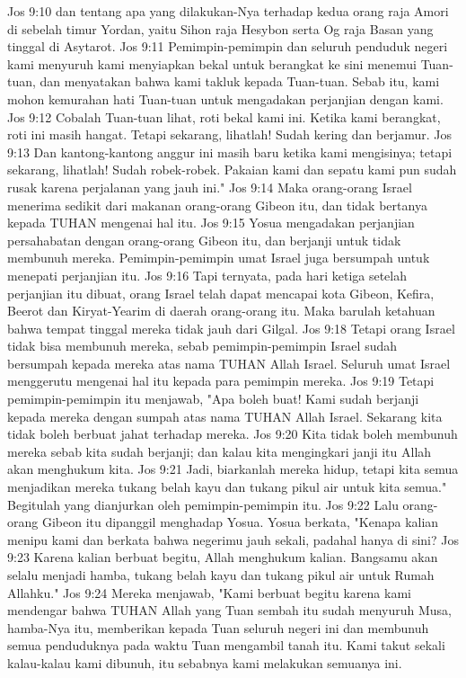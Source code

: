 Jos 9:10  dan tentang apa yang dilakukan-Nya terhadap kedua orang raja Amori di sebelah timur Yordan, yaitu Sihon raja Hesybon serta Og raja Basan yang tinggal di Asytarot.
Jos 9:11  Pemimpin-pemimpin dan seluruh penduduk negeri kami menyuruh kami menyiapkan bekal untuk berangkat ke sini menemui Tuan-tuan, dan menyatakan bahwa kami takluk kepada Tuan-tuan. Sebab itu, kami mohon kemurahan hati Tuan-tuan untuk mengadakan perjanjian dengan kami.
Jos 9:12  Cobalah Tuan-tuan lihat, roti bekal kami ini. Ketika kami berangkat, roti ini masih hangat. Tetapi sekarang, lihatlah! Sudah kering dan berjamur.
Jos 9:13  Dan kantong-kantong anggur ini masih baru ketika kami mengisinya; tetapi sekarang, lihatlah! Sudah robek-robek. Pakaian kami dan sepatu kami pun sudah rusak karena perjalanan yang jauh ini."
Jos 9:14  Maka orang-orang Israel menerima sedikit dari makanan orang-orang Gibeon itu, dan tidak bertanya kepada TUHAN mengenai hal itu.
Jos 9:15  Yosua mengadakan perjanjian persahabatan dengan orang-orang Gibeon itu, dan berjanji untuk tidak membunuh mereka. Pemimpin-pemimpin umat Israel juga bersumpah untuk menepati perjanjian itu.
Jos 9:16  Tapi ternyata, pada hari ketiga setelah perjanjian itu dibuat, orang Israel telah dapat mencapai kota Gibeon, Kefira, Beerot dan Kiryat-Yearim di daerah orang-orang itu. Maka barulah ketahuan bahwa tempat tinggal mereka tidak jauh dari Gilgal.
Jos 9:18  Tetapi orang Israel tidak bisa membunuh mereka, sebab pemimpin-pemimpin Israel sudah bersumpah kepada mereka atas nama TUHAN Allah Israel. Seluruh umat Israel menggerutu mengenai hal itu kepada para pemimpin mereka.
Jos 9:19  Tetapi pemimpin-pemimpin itu menjawab, "Apa boleh buat! Kami sudah berjanji kepada mereka dengan sumpah atas nama TUHAN Allah Israel. Sekarang kita tidak boleh berbuat jahat terhadap mereka.
Jos 9:20  Kita tidak boleh membunuh mereka sebab kita sudah berjanji; dan kalau kita mengingkari janji itu Allah akan menghukum kita.
Jos 9:21  Jadi, biarkanlah mereka hidup, tetapi kita semua menjadikan mereka tukang belah kayu dan tukang pikul air untuk kita semua." Begitulah yang dianjurkan oleh pemimpin-pemimpin itu.
Jos 9:22  Lalu orang-orang Gibeon itu dipanggil menghadap Yosua. Yosua berkata, "Kenapa kalian menipu kami dan berkata bahwa negerimu jauh sekali, padahal hanya di sini?
Jos 9:23  Karena kalian berbuat begitu, Allah menghukum kalian. Bangsamu akan selalu menjadi hamba, tukang belah kayu dan tukang pikul air untuk Rumah Allahku."
Jos 9:24  Mereka menjawab, "Kami berbuat begitu karena kami mendengar bahwa TUHAN Allah yang Tuan sembah itu sudah menyuruh Musa, hamba-Nya itu, memberikan kepada Tuan seluruh negeri ini dan membunuh semua penduduknya pada waktu Tuan mengambil tanah itu. Kami takut sekali kalau-kalau kami dibunuh, itu sebabnya kami melakukan semuanya ini.

